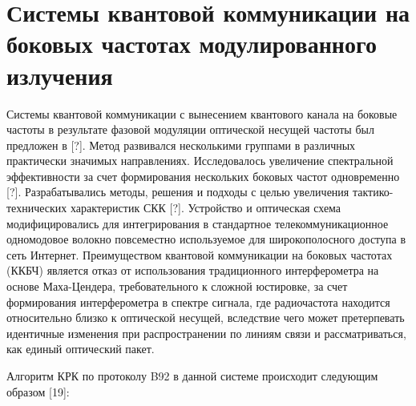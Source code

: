 
\section{Системы квантовой коммуникации на боковых частотах модулированного излучения} \label{sec:ch1/sec4}

Системы квантовой коммуникации с вынесением квантового канала на боковые частоты в результате фазовой модуляции оптической несущей частоты был предложен в [?]. Метод развивался несколькими группами в различных практически значимых направлениях. Исследовалось увеличение спектральной эффективности за счет формирования нескольких боковых частот одновременно [?]. Разрабатывались методы, решения и подходы с целью увеличения тактико-технических характеристик СКК [?]. Устройство и оптическая схема модифицировались для интегрирования в стандартное телекоммуникационное одномодовое волокно повсеместно используемое для широкополосного доступа в сеть Интернет. Преимуществом квантовой коммуникации на боковых частотах (ККБЧ) является отказ от использования традиционного интерферометра на основе Маха-Цендера, требовательного к сложной юстировке, за счет формирования интерферометра в спектре сигнала, где радиочастота находится относительно близко к оптической несущей, вследствие чего может претерпевать идентичные изменения при распространении по линиям связи и рассматриваться, как единый оптический пакет. 

 
Алгоритм КРК по протоколу B92 в данной системе происходит следующим образом [19]:


